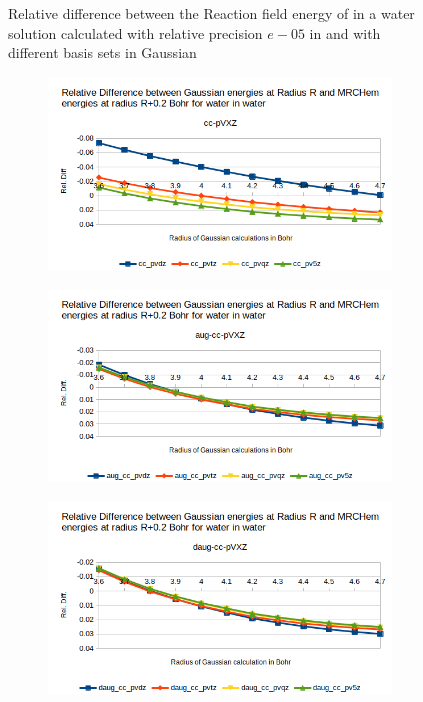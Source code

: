 \documentclass[../master_thesis.tex]{subfiles}
\begin{document}
\begin{figure}[h!]
\begin{subfigure}[b]{0.75\linewidth}
  \end{subfigure}
  \caption{Relative difference between the Reaction field energy of in a water solution calculated with relative precision $e-05$ in \mrchem
  and with different basis sets in Gaussian}
  \label{fig:lipreldiff}
\end{figure}

\begin{figure}[h!]
  \centering
  \begin{subfigure}[b]{0.75\linewidth}
    \includegraphics[width=\linewidth]{img/watreldiff02.png}
  \end{subfigure}
  \begin{subfigure}[b]{0.75\linewidth}
    \includegraphics[width=\linewidth]{img/wataugreldiff02.png}
  \end{subfigure}
  \begin{subfigure}[b]{0.75\linewidth}
    \includegraphics[width=\linewidth]{img/watdaugreldiff02.png}

\end{subfigure}
\end{figure}
\end{document}
